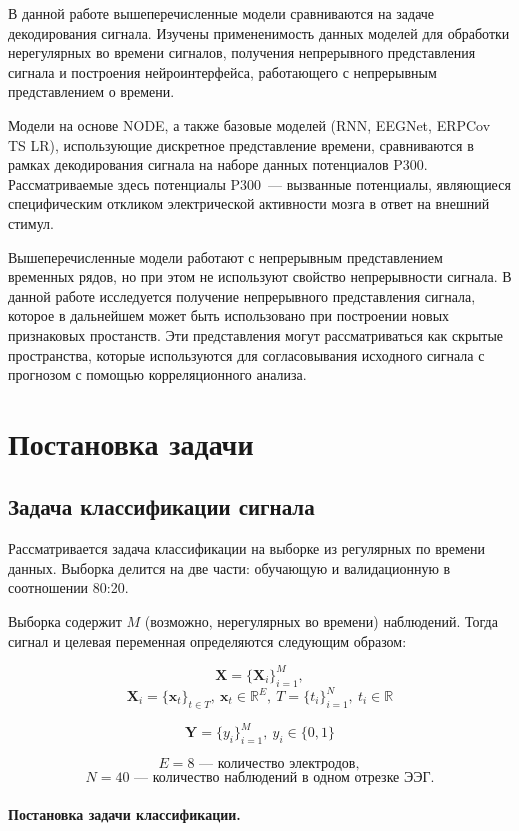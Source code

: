 \documentclass{article}
\newcommand{\x}{\mathbf{x}}
\newcommand{\Y}{\mathbf{Y}}
\newcommand{\X}{\mathbf{X}}
\newcommand{\R}{\mathbb{R}}
\begin{document}
В данной работе вышеперечисленные модели сравниваются на задаче декодирования сигнала. Изучены примененимость данных моделей для обработки нерегулярных во времени сигналов, получения непрерывного представления сигнала и построения нейроинтерфейса, работающего с непрерывным представлением о времени.

Модели на основе NODE, а также базовые моделей (RNN, EEGNet\cite{Lawhern2018EEGNetAC}, ERPCov TS LR\cite{6046114}), использующие дискретное представление времени, сравниваются в рамках декодирования сигнала на наборе данных потенциалов P300. Рассматриваемые здесь потенциалы P300~--- вызванные потенциалы, являющиеся специфическим откликом электрической активности мозга в ответ на внешний стимул.

Вышеперечисленные модели работают с непрерывным представлением временных рядов, но при этом не используют свойство непрерывности сигнала. В данной работе исследуется получение непрерывного представления сигнала, которое в дальнейшем может быть использовано при построении новых признаковых простанств. Эти представления могут рассматриваться как скрытые пространства, которые используются для согласовывания исходного сигнала с прогнозом с помощью корреляционного анализа.

\section{Постановка задачи}

\subsection{Задача классификации сигнала}
    
    Рассматривается задача классификации на выборке из регулярных по времени данных. Выборка делится на две части: обучающую и валидационную в соотношении 80:20.
    
    Выборка содержит $M$ (возможно, нерегулярных во времени) наблюдений. Тогда сигнал и целевая переменная определяются следующим образом:
    

    $$\X = \{\X_i\}_{i=1}^{M},$$
    $$\X_i = \{\x_t\}_{t\in T}, \ \x_t \in \R^E, \ T = \{t_i\}_{i=1}^{N},\ t_i \in \R$$ 
    
    $$\Y = \{y_i\}_{i=1}^{M},\ y_i \in \{0, 1\}$$
    
    $$E = 8 \text{~--- количество электродов},$$
    $$N = 40 \text{~--- количество наблюдений в одном отрезке ЭЭГ}.$$

    \paragraph{Постановка задачи классификации.}
    
\end{document}
